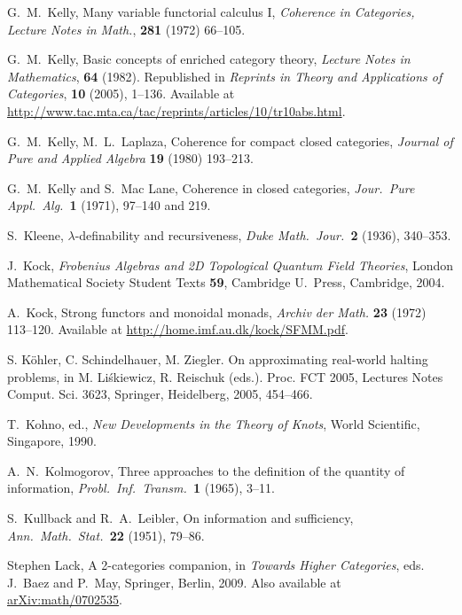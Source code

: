 \documentclass[12pt,twoside,openright]{report}
\begin{document}
\begin{thebibliography}{99}
 G.\ M.\ Kelly, Many variable functorial calculus I, \textsl{Coherence in Categories, Lecture Notes in Math.}, \textbf{281} (1972) 66--105.

 G.\ M.\ Kelly, Basic concepts of enriched category theory, \textsl{Lecture Notes in Mathematics}, \textbf{64} (1982).  Republished in \textsl{Reprints in Theory and Applications of Categories}, \textbf{10} (2005), 1--136.  Available at \href{http://www.tac.mta.ca/tac/reprints/articles/10/tr10abs.html}{http://www.tac.mta.ca/tac/reprints/articles/10/tr10abs.html}.

 G.\ M.\ Kelly, M.\ L.\ Laplaza, Coherence for compact closed categories, \textsl{Journal of Pure and Applied Algebra} \textbf{19} (1980) 193--213.

 G.\ M.\ Kelly and S.\ Mac Lane, Coherence in closed categories, {\sl Jour.\ Pure Appl.\ Alg.\ }{\bf 1} (1971), 97--140
and 219.

S.\ Kleene, $\lambda$-definability and recursiveness,
{\sl Duke Math.\ Jour.\ }{\bf 2} (1936), 340--353. 

J.\ Kock, \textsl{Frobenius Algebras and 2{D} Topological Quantum Field Theories}, London Mathematical Society Student Texts \textbf{59}, Cambridge U.\ Press, Cambridge, 2004.

 A.\ Kock, Strong functors and monoidal monads, \textsl{Archiv der Math.} \textbf{23} (1972) 113--120.  Available at \href{http://home.imf.au.dk/kock/SFMM.pdf}{http://home.imf.au.dk/kock/SFMM.pdf}.

  S. K\"ohler, C. Schindelhauer, M. Ziegler. On approximating real-world halting problems, in M. Li\'skiewicz, R. Reischuk (eds.). Proc. FCT 2005, Lectures Notes Comput. Sci. 3623, Springer, Heidelberg, 2005, 454--466.

T.\ Kohno, ed., \textsl{New Developments in the Theory of Knots}, World Scientific, Singapore, 1990.

 A.\ N.\ Kolmogorov, Three approaches to the definition of the quantity of information, 
{\sl Probl.\ Inf.\ Transm.\ }\textbf{1} (1965), 3--11.

 S.\ Kullback and R.\ A.\ Leibler, On information and sufficiency, \textsl{Ann.\ Math.\ Stat.\ }\textbf{22}
(1951), 79--86.

 Stephen Lack, A 2-categories companion, in \textsl{Towards Higher Categories}, eds. J.\ Baez and P.\ May, Springer, Berlin, 2009.  Also available at \href{http://arxiv.org/abs/math/0702535}{arXiv:math/0702535}.


\end{thebibliography}
\end{document}
